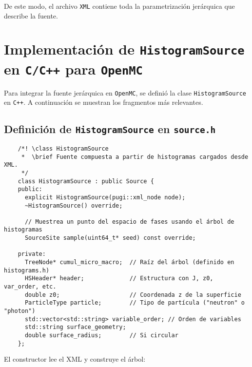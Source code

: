 De este modo, el archivo \texttt{XML} contiene toda la parametrización jerárquica que describe la fuente.

\section{Implementación  de \texttt{HistogramSource} en \texttt{C/C++} para \texttt{OpenMC}}\label{sec:histogramsource_c}

Para integrar la fuente jerárquica en \texttt{OpenMC}, se definió la clase \texttt{HistogramSource} en \texttt{C++}. A continuación se muestran los fragmentos más relevantes.

\subsection{Definición de \texttt{HistogramSource} en \texttt{source.h}}\label{subsec:source_h}

\begin{verbatim}
    /*! \class HistogramSource
     *  \brief Fuente compuesta a partir de histogramas cargados desde XML.
     */
    class HistogramSource : public Source {
    public:
      explicit HistogramSource(pugi::xml_node node);
      ~HistogramSource() override;
    
      // Muestrea un punto del espacio de fases usando el árbol de histogramas
      SourceSite sample(uint64_t* seed) const override;
    
    private:
      TreeNode* cumul_micro_macro;  // Raíz del árbol (definido en histograms.h)
      HSHeader* header;             // Estructura con J, z0, var_order, etc.
      double z0;                    // Coordenada z de la superficie
      ParticleType particle;        // Tipo de partícula ("neutron" o "photon")
      std::vector<std::string> variable_order; // Orden de variables
      std::string surface_geometry; 
      double surface_radius;        // Si circular
    };
    \end{verbatim}
    

\noindent El constructor lee el XML y construye el árbol:

